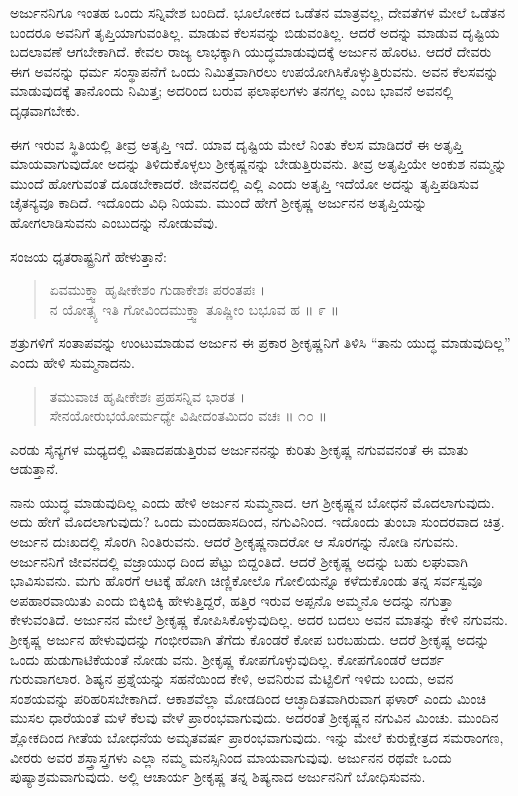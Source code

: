 ಅರ್ಜುನನಿಗೂ ಇಂತಹ ಒಂದು ಸನ್ನಿವೇಶ ಬಂದಿದೆ. ಭೂಲೋಕದ ಒಡೆತನ ಮಾತ್ರವಲ್ಲ, ದೇವತೆಗಳ ಮೇಲೆ ಒಡೆತನ ಬಂದರೂ ಅವನಿಗೆ ತೃಪ್ತಿಯಾಗುವಂತಿಲ್ಲ. ಮಾಡುವ ಕೆಲಸವನ್ನು ಬಿಡುವಂತಿಲ್ಲ. ಆದರೆ ಅದನ್ನು ಮಾಡುವ ದೃಷ್ಟಿಯ ಬದಲಾವಣೆ ಆಗಬೇಕಾಗಿದೆ. ಕೇವಲ ರಾಜ್ಯ ಲಾಭಕ್ಕಾಗಿ ಯುದ್ಧಮಾಡುವುದಕ್ಕೆ ಅರ್ಜುನ ಹೊರಟ. ಆದರೆ ದೇವರು ಈಗ ಅವನನ್ನು ಧರ್ಮ ಸಂಸ್ಥಾಪನೆಗೆ ಒಂದು ನಿಮಿತ್ತವಾಗಿರಲು ಉಪಯೋಗಿಸಿಕೊಳ್ಳುತ್ತಿರುವನು. ಅವನ ಕೆಲಸವನ್ನು ಮಾಡುವುದಕ್ಕೆ ತಾನೊಂದು ನಿಮಿತ್ತ; ಅದರಿಂದ ಬರುವ ಫಲಾಫಲಗಳು ತನಗಲ್ಲ ಎಂಬ ಭಾವನೆ ಅವನಲ್ಲಿ ದೃಢವಾಗಬೇಕು.

ಈಗ ಇರುವ ಸ್ಥಿತಿಯಲ್ಲಿ ತೀವ್ರ ಅತೃಪ್ತಿ ಇದೆ. ಯಾವ ದೃಷ್ಟಿಯ ಮೇಲೆ ನಿಂತು ಕೆಲಸ ಮಾಡಿದರೆ ಈ ಅತೃಪ್ತಿ ಮಾಯವಾಗುವುದೋ ಅದನ್ನು ತಿಳಿದುಕೊಳ್ಳಲು ಶ್ರೀಕೃಷ್ಣನನ್ನು ಬೇಡುತ್ತಿರುವನು. ತೀವ್ರ ಅತೃಪ್ತಿಯೇ ಅಂಕುಶ ನಮ್ಮನ್ನು ಮುಂದೆ ಹೋಗುವಂತೆ ದೂಡಬೇಕಾದರೆ. ಜೀವನದಲ್ಲಿ ಎಲ್ಲಿ ಎಂದು ಅತೃಪ್ತಿ ಇದೆಯೋ ಅದನ್ನು ತೃಪ್ತಿಪಡಿಸುವ ಚೈತನ್ಯವೂ ಕಾದಿದೆ. ಇದೊಂದು ವಿಧಿ ನಿಯಮ. ಮುಂದೆ ಹೇಗೆ ಶ್ರೀಕೃಷ್ಣ ಅರ್ಜುನನ ಅತೃಪ್ತಿಯನ್ನು ಹೋಗಲಾಡಿಸುವನು ಎಂಬುದನ್ನು ನೋಡುವೆವು.

ಸಂಜಯ ಧೃತರಾಷ್ಟ್ರನಿಗೆ ಹೇಳುತ್ತಾನೆ:

\begin{verse}
ಏವಮುಕ್ತ್ವಾ ಹೃಷೀಕೇಶಂ ಗುಡಾಕೇಶಃ ಪರಂತಪಃ ।\\ನ ಯೋತ್ಸ್ಯ ಇತಿ ಗೋವಿಂದಮುಕ್ತ್ವಾ ತೂಷ್ಣೀಂ ಬಭೂವ ಹ \num{॥ ೯ ॥}
\end{verse}

{\small ಶತ್ರುಗಳಿಗೆ ಸಂತಾಪವನ್ನು ಉಂಟುಮಾಡುವ ಅರ್ಜುನ ಈ ಪ್ರಕಾರ ಶ್ರೀಕೃಷ್ಣನಿಗೆ ತಿಳಿಸಿ “ತಾನು ಯುದ್ಧ ಮಾಡುವುದಿಲ್ಲ” ಎಂದು ಹೇಳಿ ಸುಮ್ಮನಾದನು.}

\begin{verse}
ತಮುವಾಚ ಹೃಷೀಕೇಶಃ ಪ್ರಹಸನ್ನಿವ ಭಾರತ ।\\ಸೇನಯೋರುಭಯೋರ್ಮಧ್ಯೇ ವಿಷೀದಂತಮಿದಂ ವಚಃ \num{॥ ೧೦ ॥}
\end{verse}

{\small ಎರಡು ಸೈನ್ಯಗಳ ಮಧ್ಯದಲ್ಲಿ ವಿಷಾದಪಡುತ್ತಿರುವ ಅರ್ಜುನನನ್ನು ಕುರಿತು ಶ್ರೀಕೃಷ್ಣ ನಗುವವನಂತೆ ಈ ಮಾತು ಆಡುತ್ತಾನೆ.}

ನಾನು ಯುದ್ಧ ಮಾಡುವುದಿಲ್ಲ ಎಂದು ಹೇಳಿ ಅರ್ಜುನ ಸುಮ್ಮನಾದ. ಆಗ ಶ್ರೀಕೃಷ್ಣನ ಬೋಧನೆ ಮೊದಲಾಗುವುದು. ಅದು ಹೇಗೆ ಮೊದಲಾಗುವುದು? ಒಂದು ಮಂದಹಾಸದಿಂದ, ನಗುವಿನಿಂದ. ಇದೊಂದು ತುಂಬಾ ಸುಂದರವಾದ ಚಿತ್ರ. ಅರ್ಜುನ ದುಃಖದಲ್ಲಿ ಸೊರಗಿ ನಿಂತಿರುವನು. ಆದರೆ ಶ್ರೀಕೃಷ್ಣನಾದರೋ ಆ ಸೊರಗನ್ನು ನೋಡಿ ನಗುವನು. ಅರ್ಜುನನಿಗೆ ಜೀವನದಲ್ಲಿ ವಜ್ರಾಯುಧ ದಿಂದ ಪೆಟ್ಟು ಬಿದ್ದಂತಿದೆ. ಆದರೆ ಶ್ರೀಕೃಷ್ಣ ಅದನ್ನು ಬಹು ಲಘುವಾಗಿ ಭಾವಿಸುವನು. ಮಗು ಹೊರಗೆ ಆಟಕ್ಕೆ ಹೋಗಿ ಚಿಣ್ಣಿಕೋಲೊ ಗೋಲಿಯನ್ನೊ ಕಳೆದುಕೊಂಡು ತನ್ನ ಸರ್ವಸ್ವವೂ ಅಪಹಾರವಾಯಿತು ಎಂದು ಬಿಕ್ಕಿಬಿಕ್ಕಿ ಹೇಳುತ್ತಿದ್ದರೆ, ಹತ್ತಿರ ಇರುವ ಅಪ್ಪನೊ ಅಮ್ಮನೊ ಅದನ್ನು ನಗುತ್ತಾ ಕೇಳುವಂತಿದೆ. ಅರ್ಜುನನ ಮೇಲೆ ಶ್ರೀಕೃಷ್ಣ ಕೋಪಿಸಿಕೊಳ್ಳುವುದಿಲ್ಲ. ಅದರ ಬದಲು ಅವನ ಮಾತನ್ನು ಕೇಳಿ ನಗುವನು. ಶ್ರೀಕೃಷ್ಣ ಅರ್ಜುನ ಹೇಳುವುದನ್ನು ಗಂಭೀರವಾಗಿ ತೆಗೆದು ಕೊಂಡರೆ ಕೋಪ ಬರಬಹುದು. ಆದರೆ ಶ್ರೀಕೃಷ್ಣ ಅದನ್ನು ಒಂದು ಹುಡುಗಾಟಿಕೆಯಂತೆ ನೋಡು ವನು. ಶ್ರೀಕೃಷ್ಣ ಕೋಪಗೊಳ್ಳುವುದಿಲ್ಲ. ಕೋಪಗೊಂಡರೆ ಆದರ್ಶ ಗುರುವಾಗಲಾರ. ಶಿಷ್ಯನ ಪ್ರಶ್ನೆಯನ್ನು ಸಹನೆಯಿಂದ ಕೇಳಿ, ಅವನಿರುವ ಮೆಟ್ಟಿಲಿಗೆ ಇಳಿದು ಬಂದು, ಅವನ ಸಂಶಯವನ್ನು ಪರಿಹರಿಸಬೇಕಾಗಿದೆ. ಆಕಾಶವೆಲ್ಲಾ ಮೋಡದಿಂದ ಆಚ್ಛಾದಿತವಾಗಿರುವಾಗ ಫಳಾರ್ ಎಂದು ಮಿಂಚಿ ಮುಸಲ ಧಾರೆಯಂತೆ ಮಳೆ ಕೆಲವು ವೇಳೆ ಪ್ರಾರಂಭವಾಗುವುದು. ಅದರಂತೆ ಶ್ರೀಕೃಷ್ಣನ ನಗುವಿನ ಮಿಂಚು. ಮುಂದಿನ ಶ್ಲೋಕದಿಂದ ಗೀತೆಯ ಬೋಧನೆಯ ಅಮೃತವರ್ಷ ಪ್ರಾರಂಭವಾಗುವುದು. ಇನ್ನು ಮೇಲೆ ಕುರುಕ್ಷೇತ್ರದ ಸಮರಾಂಗಣ, ವೀರರು ಅವರ ಶಸ್ತ್ರಾಸ್ತ್ರಗಳು ಎಲ್ಲಾ ನಮ್ಮ ಮನಸ್ಸಿನಿಂದ ಮಾಯವಾಗುವುವು. ಅರ್ಜುನನ ರಥವೇ ಒಂದು ಪುಷ್ಯಾಶ್ರಮವಾಗುವುದು. ಅಲ್ಲಿ ಆಚಾರ್ಯ ಶ್ರೀಕೃಷ್ಣ ತನ್ನ ಶಿಷ್ಯನಾದ ಅರ್ಜುನನಿಗೆ ಬೋಧಿಸುವನು.

